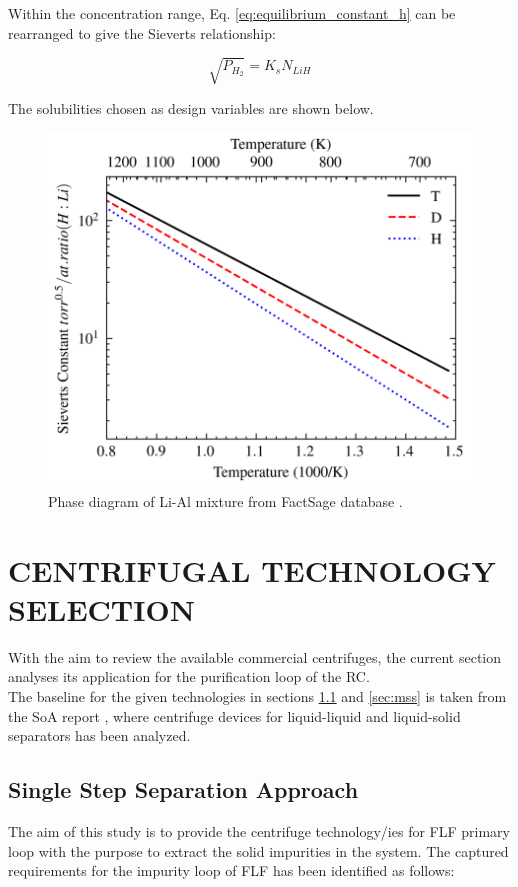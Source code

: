Within the concentration range, Eq. \ref{eq:equilibrium_constant_h} can be rearranged to give the Sieverts relationship:

\begin{equation}
\sqrt{P_{H_2}} = K_s N_{LiH}
\end{equation}

The solubilities chosen as design variables are shown below.
\begin{figure}[H]
    \centering
    \includegraphics[width=0.8\linewidth]{hydrogen_solubility.png}
    \caption{Phase diagram of Li-Al mixture from FactSage database \cite{Bale2016}.}
    \label{fig:al_li_diagram}
\end{figure}

\newpage

\section{CENTRIFUGAL TECHNOLOGY SELECTION} \label{sec:eng}%
With the aim to review the available commercial centrifuges, the current section analyses its application for the purification loop of the RC. \\

\noindent The baseline for the given technologies in sections \ref{sec:sss} and \ref{sec:mss} is taken from the SoA report \cite{SoA}, where centrifuge devices for liquid-liquid and liquid-solid separators has been analyzed. 

\subsection{Single Step Separation Approach}\label{sec:sss}
The aim of this study is to provide the centrifuge technology/ies for FLF primary loop with the purpose to extract the solid impurities in the system. The captured requirements for the impurity loop of FLF has been identified as follows:

